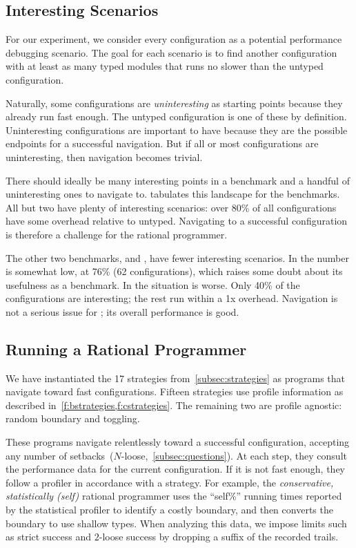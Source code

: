 \subsection{Interesting Scenarios} 

For our experiment, we consider every configuration as a potential
performance debugging scenario.
The goal for each scenario is to find another configuration
with at least as many typed modules that runs no slower than the
untyped configuration.

Naturally, some configurations are \emph{uninteresting} as starting
points because they already run fast enough.
The untyped configuration is one of these by definition.
Uninteresting configurations are important to have because they
are the possible endpoints for a successful navigation.
But if all or most configurations are uninteresting, then
navigation becomes trivial.

There should ideally be many interesting points in a benchmark
and a handful of uninteresting ones to navigate to.
 tabulates this landscape for the benchmarks.
All but two have plenty of interesting scenarios: over 80\% of
all configurations have some overhead relative to untyped.
Navigating to a successful configuration is therefore a challenge
for the rational programmer.

The other two benchmarks,  and , have
fewer interesting scenarios.
In  the number is somewhat low, at 76\% (62 configurations),
which raises some doubt about its usefulness as a benchmark.
In  the situation is worse.
Only 40\% of the configurations are interesting; the rest run within a 1x
overhead.
Navigation is not a serious issue for ; its overall
performance is good.



\subsection{Running a Rational Programmer} \label{subsec:qx}

We have instantiated the 17 strategies from~\cref{subsec:strategies} as
programs that navigate toward fast configurations.
Fifteen strategies use profile information as described in~\cref{f:bstrategies,f:cstrategies}.
The remaining two are profile agnostic: random boundary and toggling.

These programs navigate relentlessly toward a successful configuration,
accepting any number of setbacks~($N$-loose,~\cref{subsec:questions}).
At each step, they consult the performance data for the current configuration.
If it is not fast enough, they follow a profiler in accordance with a strategy.
For example, the \emph{conservative, statistically (self)} rational programmer
uses the ``self\%'' running times reported by the statistical profiler to
identify a costly boundary, and then converts the boundary to use shallow types.
When analyzing this data, we impose limits such as strict success and
$2$-loose success by dropping a suffix of the recorded trails.

